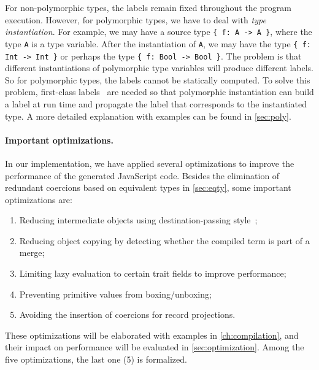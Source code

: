 For non-polymorphic types, the labels remain fixed throughout the program
execution. However, for polymorphic types, we have to deal with \emph{type
instantiation}. For example, we may have a source type \lstinline|{ f: A -> A }|,
where the type \lstinline|A| is a type variable. After the instantiation of
\lstinline|A|, we may have the type \lstinline|{ f: Int -> Int }| or perhaps
the type \lstinline|{ f: Bool -> Bool }|. The problem is that different
instantiations of polymorphic type variables will produce different labels. So
for polymorphic types, the labels cannot be statically computed. To solve this
problem, first-class labels~\citep{leijen2004first} are needed so that
polymorphic instantiation can build a label at run time and propagate the label
that corresponds to the instantiated type. A more detailed explanation with
examples can be found in \autoref{sec:poly}.

\paragraph{Important optimizations.}
In our implementation, we have applied several optimizations to improve the
performance of the generated JavaScript code. Besides the elimination of
redundant coercions based on equivalent types in \autoref{sec:eqty}, some
important optimizations are:
\begin{enumerate}
\item Reducing intermediate objects using destination-passing
      style~\citep{shaikhha2017destination};
\item Reducing object copying by detecting whether the compiled term is part of
      a merge;
\item Limiting lazy evaluation to certain trait fields to improve performance;
\item Preventing primitive values from boxing/unboxing;
\item Avoiding the insertion of coercions for record projections.
\end{enumerate}
These optimizations will be elaborated with examples in
\autoref{ch:compilation}, and their impact on performance will be evaluated in
\autoref{sec:optimization}. Among the five optimizations, the last one (5) is
formalized.
